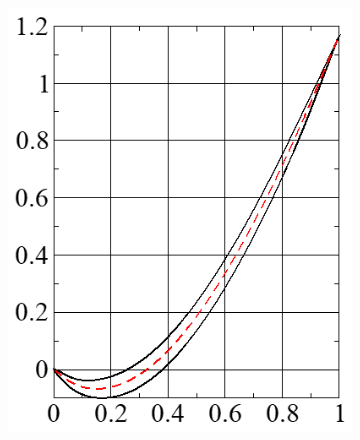 \begin{figure}[h]
  \centering
  \begin{subfigure}[t]{0.4\textwidth}
    \includegraphics[width=\textwidth]{figures/stator-thick-blade.PNG}
  \end{subfigure}
  \begin{subfigure}[t]{0.42\textwidth}
    \hspace{2pt}

\end{subfigure}
\end{figure}
